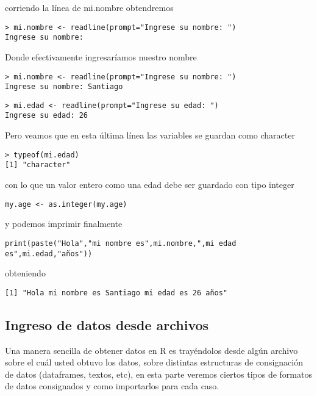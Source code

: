 \documentclass[]{article}
\begin{document}
corriendo la línea de mi.nombre obtendremos

\begin{verbatim}
> mi.nombre <- readline(prompt="Ingrese su nombre: ")
Ingrese su nombre:
\end{verbatim}

Donde efectivamente ingresaríamos nuestro nombre

\begin{verbatim}
> mi.nombre <- readline(prompt="Ingrese su nombre: ")
Ingrese su nombre: Santiago
\end{verbatim}

\begin{verbatim}
> mi.edad <- readline(prompt="Ingrese su edad: ")
Ingrese su edad: 26
\end{verbatim}

Pero veamos que en esta última línea las variables se guardan como
character

\begin{verbatim}
> typeof(mi.edad)
[1] "character"
\end{verbatim}

con lo que un valor entero como una edad debe ser guardado con tipo
integer

\begin{verbatim}
my.age <- as.integer(my.age)
\end{verbatim}

y podemos imprimir finalmente

\begin{verbatim}
print(paste("Hola","mi nombre es",mi.nombre,",mi edad es",mi.edad,"años"))
\end{verbatim}

obteniendo

\begin{verbatim}
[1] "Hola mi nombre es Santiago mi edad es 26 años"
\end{verbatim}

\subsection{Ingreso de datos desde
archivos}\label{ingreso-de-datos-desde-archivos}

Una manera sencilla de obtener datos en R es trayéndolos desde algún
archivo sobre el cuál usted obtuvo los datos, sobre distintas
estructuras de consignación de datos (dataframes, textos, etc), en esta
parte veremos ciertos tipos de formatos de datos consignados y como
importarlos para cada caso.
\end{document}
